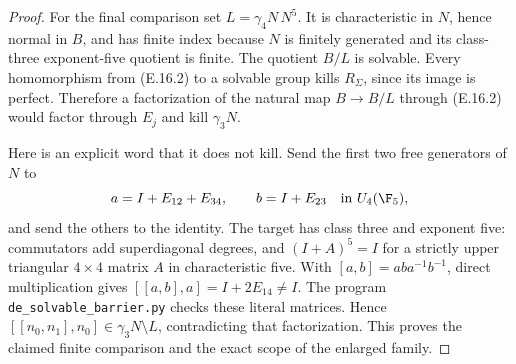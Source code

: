 \begin{proof}
For the final comparison set $L=\gamma_4N\,N^5$.
It is characteristic in $N$, hence normal in $B$,
and has finite index because $N$ is finitely generated
and its class-three exponent-five quotient is finite.
The quotient $B/L$ is solvable. Every homomorphism
from (E.16.2) to a solvable group kills $R_\Sigma$,
since its image is perfect. Therefore a factorization
of the natural map $B\to B/L$ through (E.16.2)
would factor through $E_j$ and kill $\gamma_3N$.

Here is an explicit word that it does not kill.
Send the first two free generators of $N$ to
\[
 a=I+E_{12}+E_{34},\qquad b=I+E_{23}
                    \quad\hbox{in }U_4(\F_5),
\]
and send the others to the identity. The target has
class three and exponent five: commutators add
superdiagonal degrees, and $(I+A)^5=I$ for a strictly
upper triangular $4\times4$ matrix $A$ in
characteristic five. With $[a,b]=aba^{-1}b^{-1}$,
direct multiplication gives
$[[a,b],a]=I+2E_{14}\ne I$.
The program \texttt{de\_solvable\_barrier.py}
checks these literal matrices. Hence
$[[n_0,n_1],n_0]\in\gamma_3N\setminus L$,
contradicting that factorization. This proves the
claimed finite comparison and the exact scope of
the enlarged family.
\end{proof}


